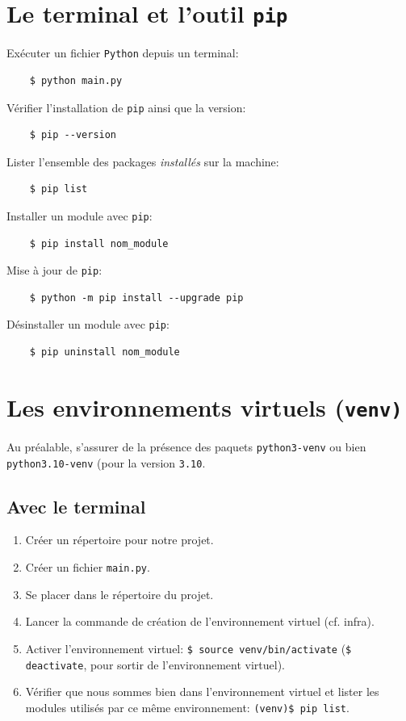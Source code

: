\documentclass[a4paper,11pt]{book}
\begin{document}
\section{Le terminal et l'outil \texttt{pip}}
Exécuter un fichier \texttt{Python} depuis un terminal:
\begin{verbatim}
    $ python main.py
\end{verbatim} 
\medskip

Vérifier l'installation de \texttt{pip} ainsi que la version:
\begin{verbatim}
    $ pip --version
\end{verbatim}
\medskip

Lister l'ensemble des packages \textit{installés} sur la machine:
\begin{verbatim}
    $ pip list
\end{verbatim}
\medskip

Installer un module avec \texttt{pip}:
\begin{verbatim}
    $ pip install nom_module
\end{verbatim}
\medskip

Mise à jour de \texttt{pip}:
\begin{verbatim}
    $ python -m pip install --upgrade pip
\end{verbatim}
\medskip

Désinstaller un module avec \texttt{pip}:
\begin{verbatim}
    $ pip uninstall nom_module
\end{verbatim}
\medskip

\section{Les environnements virtuels (\texttt{venv)}}
Au préalable, s'assurer de la présence des paquets \texttt{python3-venv} ou bien \texttt{python3.10-venv} (pour la version \texttt{3.10}.
\subsection*{Avec le terminal}
\begin{enumerate}
	\item Créer un répertoire pour notre projet.
	\item Créer un fichier \texttt{main.py}.
	\item Se placer dans le répertoire du projet.
	\item Lancer la commande de création de l'environnement virtuel (cf. infra).
	\item Activer l'environnement virtuel: \verb|$ source venv/bin/activate| (\verb|$ deactivate|, pour sortir de l'environnement virtuel).
	\item Vérifier que nous sommes bien dans l'environnement virtuel et lister les modules utilisés par ce même environnement: \verb|(venv)$ pip list|.
\end{enumerate}
\medskip
\end{document}
